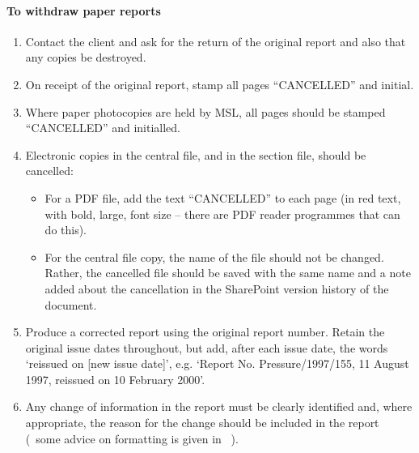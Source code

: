 \paragraph{To withdraw paper reports}
\begin{enumerate}
\item Contact the client and ask for the return of the original report and also that any copies be destroyed. 

\item On receipt of the original report, stamp all pages ``{\color{red}CANCELLED}” and initial. 

\item Where paper photocopies are held by MSL, all pages should be stamped ``{\color{red}CANCELLED}” and initialled.

\item Electronic copies in the central file, and in the section file, should be cancelled:
\begin{itemize}
\item For a PDF file, add the text “{\color{red}CANCELLED}” to each page (in red text, with bold, large, font size – there are PDF reader programmes that can do this). 
\item For the central file copy, the name of the file should not be changed. Rather, the cancelled file should be saved with the same name and a note added about the cancellation in the SharePoint version history of the document. 
\end{itemize}

\item Produce a corrected report using the original report number.  Retain the original issue dates throughout, but add, after each issue date, the words `reissued on [new issue date]', e.g. `Report No. Pressure/1997/155, 11 August 1997, reissued on 10 February 2000'.

\item Any change of information in the report must be clearly identified and, where appropriate, the reason for the change should be included in the report (~some advice on formatting is given in \cite[\S\ref*{GRP-ss:reissued_reports}]{MSL_Reporting_Guidelines}~).


\end{enumerate}
